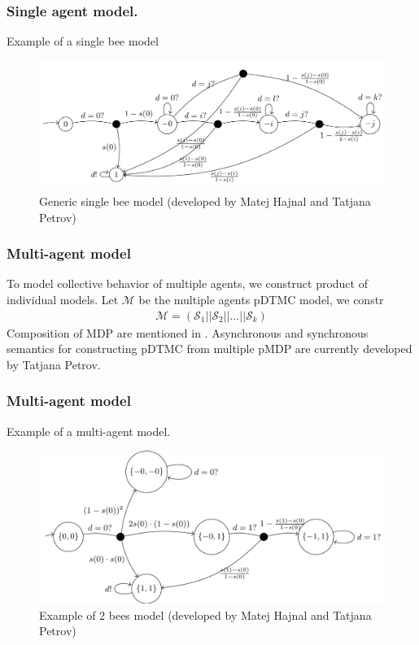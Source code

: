 \documentclass{beamer}
\begin{document}
\begin{frame}
  \frametitle{Single agent model.}
  Example of a single bee model
  \begin{figure}[t]
    \includegraphics[height=0.4\textheight]{smodel.png} \centering
    \caption{Generic single bee model (developed by Matej Hajnal and
      Tatjana Petrov)}
  \end{figure}
\end{frame}


\begin{frame}
  \frametitle{Multi-agent model}
  To model collective behavior of multiple agents, we construct product of
  individual models. Let $\mathcal{M}$ be the multiple agents pDTMC model, we constr
  \begin{align*}
    \mathcal{M} = (\mathcal{S}_1||\mathcal{S}_2||\ldots||\mathcal{S}_k)
  \end{align*}
  Composition of MDP are mentioned in \cite{sokolova2004probabilistic}.
  Asynchronous and synchronous semantics for constructing pDTMC from multiple
  pMDP are currently developed by Tatjana Petrov.
\end{frame}

\begin{frame}
  \frametitle{Multi-agent model}
  Example of a multi-agent model.
  \begin{figure}[t]
    \includegraphics[height=0.4\textheight]{mmodel.png} \centering
    \caption{Example of 2 bees model (developed by Matej Hajnal and
      Tatjana Petrov)}
  \end{figure}
\end{frame}
\end{document}
